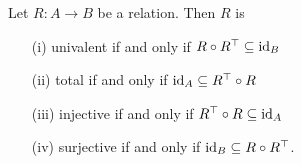 \begin{theorem} \label{calculus-of-relations}
	Let $R : A \to B$ be a relation. Then $R$ is
	\\

	\begin{itemize}
		\item[(i)] univalent if and only if $R \circ R^{\top} \subseteq \operatorname{\mathrm{id}}_{B}$
		\\ 

		\item[(ii)] total if and only if $\operatorname{\mathrm{id}}_{A} \subseteq R^{\top} \circ R$
		\\

		\item[(iii)] injective if and only if $R^{\top} \circ R \subseteq \operatorname{\mathrm{id}}_{A}$
		\\

		\item[(iv)] surjective if and only if $\operatorname{\mathrm{id}}_{B} \subseteq R \circ R^{\top}$.
		\\
	\end{itemize}
\end{theorem}

